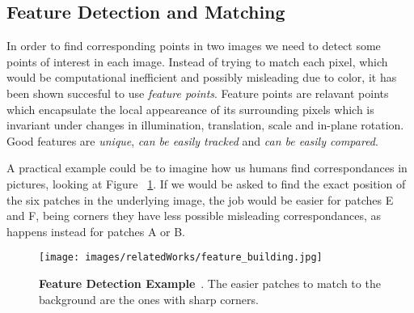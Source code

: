  \subsection{Feature Detection and Matching }
 In order to find corresponding points in two images we need to detect some points of interest in each image.
 Instead of trying to match each pixel, which would be computational inefficient and possibly misleading due to color,
 it has been shown succesful to use \textit{feature points}. Feature points are relavant points which encapsulate the local
 appeareance of its surrounding pixels which is invariant under changes in illumination, translation, scale and in-plane rotation.
 Good features are \textit{unique}, \textit{can be easily tracked} and \textit{can be easily compared}.

 A practical example could be to imagine how us humans find correspondances in pictures, looking at Figure
~\ref{fig:sfm_opencv}. If we would be asked to find the exact position of the six patches in the underlying image,
the job would be easier for patches E and F, being corners they have less possible misleading correspondances, as happens
instead for patches A or B.
 \begin{figure}[H]
    \centering
    \texttt{[image: images/relatedWorks/feature\_building.jpg]} 
    \caption{\textbf{Feature Detection Example}~\cite{open_cv}. The easier patches to match to the background are the ones with sharp corners.}
    \label{fig:sfm_opencv}
\end{figure}


